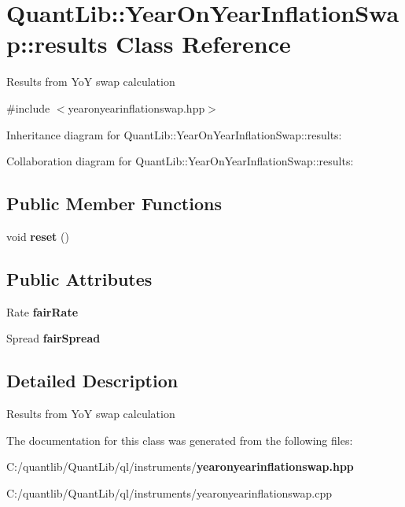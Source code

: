 \section{Quant\+Lib\+:\+:Year\+On\+Year\+Inflation\+Swap\+:\+:results Class Reference}
\label{class_quant_lib_1_1_year_on_year_inflation_swap_1_1results}


Results from YoY swap calculation  




{\ttfamily \#include $<$yearonyearinflationswap.\+hpp$>$}



Inheritance diagram for Quant\+Lib\+:\+:Year\+On\+Year\+Inflation\+Swap\+:\+:results\+:


Collaboration diagram for Quant\+Lib\+:\+:Year\+On\+Year\+Inflation\+Swap\+:\+:results\+:
\subsection*{Public Member Functions}
\begin{DoxyCompactItemize}
\item 
void {\bfseries reset} ()\label{class_quant_lib_1_1_year_on_year_inflation_swap_1_1results_a741f45e4dca828ea36140fd7e034be03}

\end{DoxyCompactItemize}
\subsection*{Public Attributes}
\begin{DoxyCompactItemize}
\item 
Rate {\bfseries fair\+Rate}\label{class_quant_lib_1_1_year_on_year_inflation_swap_1_1results_aa3e2ee446c27c32675822aba4af16f74}

\item 
Spread {\bfseries fair\+Spread}\label{class_quant_lib_1_1_year_on_year_inflation_swap_1_1results_a35175a844fcd611cf75d73cb1f815913}

\end{DoxyCompactItemize}


\subsection{Detailed Description}
Results from YoY swap calculation 

The documentation for this class was generated from the following files\+:\begin{DoxyCompactItemize}
\item 
C\+:/quantlib/\+Quant\+Lib/ql/instruments/{\bf yearonyearinflationswap.\+hpp}\item 
C\+:/quantlib/\+Quant\+Lib/ql/instruments/yearonyearinflationswap.\+cpp\end{DoxyCompactItemize}
